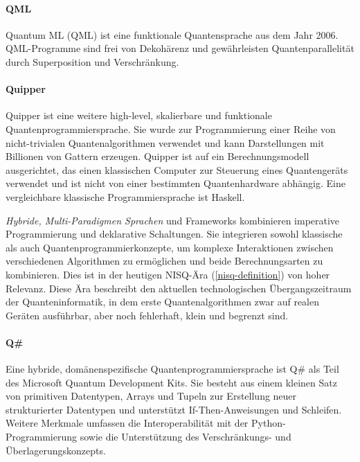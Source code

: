 \paragraph{QML} Quantum ML (QML) ist eine funktionale Quantensprache aus dem Jahr 2006. QML-Programme sind frei von Dekohärenz und gewährleisten Quantenparallelität durch Superposition und Verschränkung. \autocite{garhwal_quantum_2021}

\paragraph{Quipper} Quipper ist eine weitere high-level, skalierbare und funktionale Quantenprogrammiersprache. Sie wurde zur Programmierung einer Reihe von nicht-trivialen Quantenalgorithmen verwendet und kann Darstellungen mit Billionen von Gattern erzeugen. Quipper ist auf ein Berechnungsmodell ausgerichtet, das einen klassischen Computer zur Steuerung eines Quantengeräts verwendet und ist nicht von einer bestimmten Quantenhardware abhängig. \autocite{green_quipper_2013} Eine vergleichbare klassische Programmiersprache ist Haskell.

\textit{Hybride, Multi-Paradigmen Sprachen} und Frameworks kombinieren imperative Programmierung und deklarative Schaltungen. Sie integrieren sowohl klassische als auch Quantenprogrammierkonzepte, um komplexe Interaktionen zwischen verschiedenen Algorithmen zu ermöglichen und beide Berechnungsarten zu kombinieren. Dies ist in der heutigen NISQ-Ära (\autoref{nisq-definition}) von hoher Relevanz. Diese Ära beschreibt den aktuellen technologischen Übergangszeitraum der Quanteninformatik, in dem erste Quantenalgorithmen zwar auf realen Geräten ausführbar, aber noch fehlerhaft, klein und begrenzt sind. 

\paragraph{Q\#} Eine hybride, domänenspezifische Quantenprogrammiersprache ist Q\# als Teil des Microsoft Quantum Development Kits. Sie besteht aus einem kleinen Satz von primitiven Datentypen, Arrays und Tupeln zur Erstellung neuer strukturierter Datentypen und unterstützt If-Then-Anweisungen und Schleifen. Weitere Merkmale umfassen die Interoperabilität mit der Python-Programmierung sowie die Unterstützung des Verschränkungs- und Überlagerungskonzepts. \autocite{garhwal_quantum_2021}

